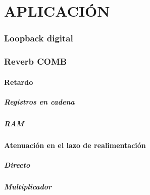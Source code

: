 \part{APLICACIÓN}

\section{Loopback digital}


\section{Reverb COMB}
	

	\subsection{Retardo}
		\subsubsection{Registros en cadena}
		\subsubsection{RAM}

	\subsection{Atenuación en el lazo de realimentación}
		\subsubsection{Directo}
		\subsubsection{Multiplicador}

	



